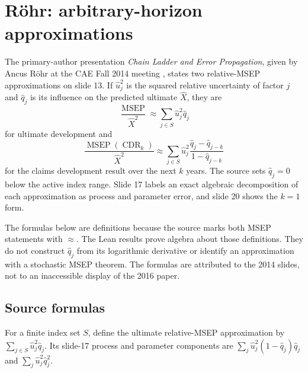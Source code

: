 
\chapter{R\"ohr: arbitrary-horizon approximations}

The primary-author presentation \emph{Chain Ladder and Error Propagation}, given by
Ancus R\"ohr at the CAE Fall 2014 meeting \cite{Rohr2014}, states two relative-MSEP approximations on
slide 13. If $\hat u_j^2$ is the squared relative uncertainty of factor $j$ and
$\hat q_j$ is its influence on the predicted ultimate $\hat X$, they are
\[
  \frac{\operatorname{MSEP}}{\hat X^2}
    \approx \sum_{j\in S}\hat u_j^2\hat q_j
\]
for ultimate development and
\[
  \frac{\operatorname{MSEP}(\operatorname{CDR}_k)}{\hat X^2}
    \approx \sum_{j\in S}\hat u_j^2
      \frac{\hat q_j-\hat q_{j-k}}{1-\hat q_{j-k}}
\]
for the claims development result over the next $k$ years. The source sets
$\hat q_j=0$ below the active index range. Slide 17 labels an exact algebraic
decomposition of each approximation as process and parameter error, and slide 20
shows the $k=1$ form.

The formulas below are definitions because the source marks both MSEP statements with
$\approx$. The Lean results prove algebra about those definitions. They do not construct
$\hat q_j$ from its logarithmic derivative or identify an approximation with a stochastic
MSEP theorem. The formulas are attributed to the 2014 slides, not to an inaccessible
display of the 2016 paper.

\section{Source formulas}

\begin{definition}\label{def:rohrHorizonUltimate}\leanok
For a finite index set $S$, define the ultimate relative-MSEP approximation by
$\sum_{j\in S}\hat u_j^2\hat q_j$. Its slide-17 process and parameter components are
$\sum_j\hat u_j^2(1-\hat q_j)\hat q_j$ and
$\sum_j\hat u_j^2\hat q_j^2$.
\end{definition}

